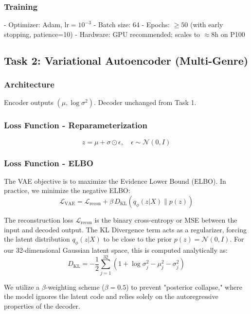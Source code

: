 \documentclass[conference]{IEEEtran}
\begin{document}
\subsubsection{Training}
- Optimizer: Adam, $\text{lr} = 10^{-3}$
- Batch size: 64
- Epochs: $\geq 50$ (with early stopping, patience=10)
- Hardware: GPU recommended; scales to $\approx 8$h on P100

\subsection{Task 2: Variational Autoencoder (Multi-Genre)}

\subsubsection{Architecture}
Encoder outputs $(\mu, \log \sigma^2)$. Decoder unchanged from Task 1.

\subsubsection{Loss Function - Reparameterization}
\begin{equation}
z = \mu + \sigma \odot \epsilon, \quad \epsilon \sim \mathcal{N}(0, I)
\end{equation}

\subsubsection{Loss Function - ELBO}
The VAE objective is to maximize the Evidence Lower Bound (ELBO). In practice, we minimize the negative ELBO:
\begin{equation}
\mathcal{L}_{\text{VAE}} = \mathcal{L}_{\text{recon}} + \beta \, D_{\text{KL}}(q_\phi(z|X) \| p(z))
\end{equation}

The reconstruction loss $\mathcal{L}_{\text{recon}}$ is the binary cross-entropy or MSE between the input and decoded output. The KL Divergence term acts as a regularizer, forcing the latent distribution $q_\phi(z|X)$ to be close to the prior $p(z) = \mathcal{N}(0, I)$. For our 32-dimensional Gaussian latent space, this is computed analytically as:
\begin{equation}
D_{\text{KL}} = -\frac{1}{2} \sum_{j=1}^{32} \left(1 + \log \sigma_j^2 - \mu_j^2 - \sigma_j^2 \right)
\end{equation}

We utilize a $\beta$-weighting scheme ($\beta = 0.5$) to prevent "posterior collapse," where the model ignores the latent code and relies solely on the autoregressive properties of the decoder.
\end{document}
